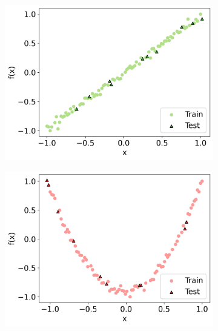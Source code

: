 \documentclass[journal=jacsat,manuscript=article]{achemso}
\begin{document}
\begin{figure}[H]
	\centering
	\begin{subfigure}[b]{0.3\textwidth}
		\centering
		\includegraphics[width=\textwidth]{images/Function_Fitting/function_dataset/linear_train_vs_test.png}
		\caption{}
		\label{fig:linear_train_vs_test}
	\end{subfigure}
	\hfill
	\begin{subfigure}[b]{0.3\textwidth}
		\centering
		\includegraphics[width=\textwidth]{images/Function_Fitting/function_dataset/quadratic_train_vs_test.png}
		\caption{}
		\label{fig:quadratic_train_vs_test}
	\end{subfigure}
	\hfill
	\begin{subfigure}[b]{0.3\textwidth}

\end{subfigure}
\end{figure}
\end{document}
